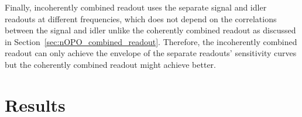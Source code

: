 Finally, incoherently combined readout uses the separate signal and idler readouts at different frequencies, which does not depend on the correlations between the signal and idler unlike the coherently combined readout as discussed in Section~\ref{sec:nOPO_combined_readout}. Therefore, the incoherently combined readout can only achieve the envelope of the separate readouts' sensitivity curves but the coherently combined readout might achieve better.



\section{Results}
\label{sec:idlerRO_initial_results}

